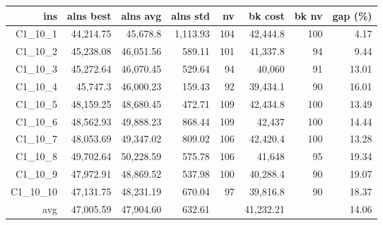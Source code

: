   \begin{table}[caption={Kết quả đo với tập HG\_C\_1\_10 1000 yêu cầu}, label=exp:HGC110]
    \centering
    \begin{tabular}{rrrrrrrr}
    \hline
    ins & alns best & alns avg & alns std & nv & bk cost & bk nv & gap (\%) \\ \hline
    C1\_10\_1 & 44,214.75 & 45,678.8 & 1,113.93 & 104 & 42,444.8 & 100 & 4.17 \\ \hline
    C1\_10\_2 & 45,238.08 & 46,051.56 & 589.11 & 101 & 41,337.8 & 94 & 9.44 \\ \hline
    C1\_10\_3 & 45,272.64 & 46,070.45 & 529.64 & 94 & 40,060 & 91 & 13.01 \\ \hline
    C1\_10\_4 & 45,747.3 & 46,000.23 & 159.43 & 92 & 39,434.1 & 90 & 16.01 \\ \hline
    C1\_10\_5 & 48,159.25 & 48,680.45 & 472.71 & 109 & 42,434.8 & 100 & 13.49 \\ \hline
    C1\_10\_6 & 48,562.93 & 49,888.23 & 868.44 & 109 & 42,437 & 100 & 14.44 \\ \hline
    C1\_10\_7 & 48,053.69 & 49,347.02 & 809.02 & 106 & 42,420.4 & 100 & 13.28 \\ \hline
    C1\_10\_8 & 49,702.64 & 50,228.59 & 575.78 & 106 & 41,648 & 95 & 19.34 \\ \hline
    C1\_10\_9 & 47,972.91 & 48,869.52 & 537.98 & 100 & 40,288.4 & 90 & 19.07 \\ \hline
    C1\_10\_10 & 47,131.75 & 48,231.19 & 670.04 & 97 & 39,816.8 & 90 & 18.37 \\ \hline
    avg & 47,005.59 & 47,904.60 & 632.61 & & 41,232.21 & & 14.06 \\ \hline
    \end{tabular}
  \end{table}

